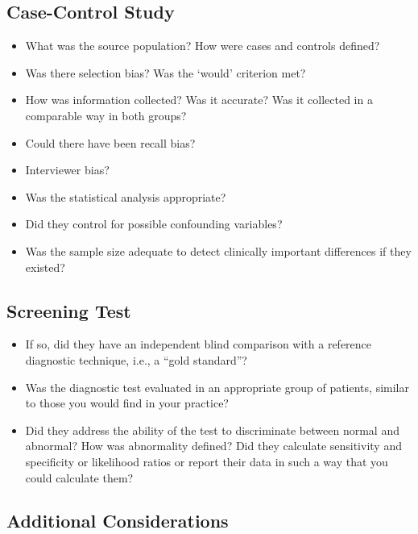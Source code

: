 \documentclass[]{book}
\providecommand{\tightlist}{%
  \setlength{\itemsep}{0pt}\setlength{\parskip}{0pt}}
\begin{document}
\hypertarget{case-control-study}{%
\subsection{Case-Control Study}\label{case-control-study}}

\begin{itemize}
\tightlist
\item
  What was the source population? How were cases and controls defined?
\item
  Was there selection bias? Was the `would' criterion met?
\item
  How was information collected? Was it accurate? Was it collected in a comparable way in both groups?
\item
  Could there have been recall bias?
\item
  Interviewer bias?
\item
  Was the statistical analysis appropriate?
\item
  Did they control for possible confounding variables?
\item
  Was the sample size adequate to detect clinically important differences if they existed?
\end{itemize}

\hypertarget{screening-test}{%
\subsection{Screening Test}\label{screening-test}}

\begin{itemize}
\tightlist
\item
  If so, did they have an independent blind comparison with a reference diagnostic technique, i.e., a ``gold standard''?
\item
  Was the diagnostic test evaluated in an appropriate group of patients, similar to those you would find in your practice?
\item
  Did they address the ability of the test to discriminate between normal and abnormal? How was abnormality defined? Did they calculate sensitivity and specificity or likelihood ratios or report their data in such a way that you could calculate them?
\end{itemize}

\hypertarget{additional-considerations}{%
\subsection{Additional Considerations}\label{additional-considerations}}
\end{document}
